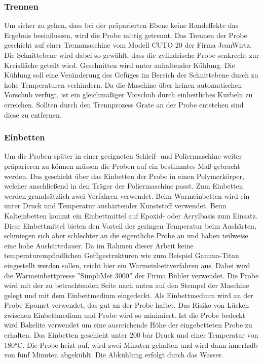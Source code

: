 \documentclass[a4paper, 11pt]{tubsreprt}
\begin{document}
\subsubsection{Trennen}
Um sicher zu gehen, dass bei der präparierten Ebene keine Randeffekte das Ergebnis beeinflussen, wird die Probe mittig getrennt. Das Trennen der Probe geschieht auf einer Trennmaschine vom Modell CUTO 20 der Firma JeanWirtz. Die Schnittebene wird dabei so gewählt, dass die zylindrische Probe senkrecht zur Kreisfläche geteilt wird. Geschnitten wird unter anhaltender Kühlung. Die Kühlung soll eine Veränderung des Gefüges im Bereich der Schnittebene durch zu hohe Temperaturen verhindern. Da die Maschine über keinen automatischen Vorschub verfügt, ist ein gleichmäßiger Vorschub durch einheitliches Kurbeln zu erreichen. Sollten durch den Trennprozess Grate an der Probe entstehen sind diese zu entfernen.
\subsubsection{Einbetten}
Um die Proben später in einer geeigneten Schleif- und Poliermaschine weiter präparieren zu können müssen die Proben auf ein bestimmtes Maß gebracht werden. Das geschieht über das Einbetten der Probe in einen Polymerkörper, welcher anschließend in den Träger der Poliermaschine passt. Zum Einbetten werden grundsätzlich zwei Verfahren verwendet. Beim Warmeinbetten wird ein unter Druck und Temperatur aushärtender Kunststoff verwendet. Beim Kalteinbetten kommt ein Einbettmittel auf Epoxid- oder Acrylbasis zum Einsatz. Diese Einbettmittel bieten den Vorteil der geringen Temperatur beim Aushärten, schmiegen sich aber schlechter an die eigentliche Probe an und haben teilweise eine hohe Aushärtedauer. Da im Rahmen dieser Arbeit keine temperaturempfindlichen Gefügestrukturen wie zum Beispiel Gamma-Titan eingestellt werden sollen, reicht hier ein Warmeinbettverfahren aus. Dabei wird die  Warmeinbettpresse ''SimpliMet 3000'' der Firma Bühler verwendet. Die Probe wird mit der zu betrachtenden Seite nach unten auf den Stempel der Maschine gelegt und mit dem Einbettmedium eingedeckt. Als Einbettmedium wird an der Probe Epomet verwendet, das gut an der Probe haftet. Das Risiko von Lücken zwischen Einbettmedium und Probe wird so minimiert. Ist die Probe bedeckt wird Bakelite verwendet um eine ausreichende Höhe der eingebetteten Probe zu erhalten. Das Einbetten geschieht unter 200 bar Druck und einer Temperatur von 180°C. Die Probe heizt auf, wird zwei Minuten gehalten und wird dann innerhalb von fünf Minuten abgekühlt. Die Abkühlung erfolgt durch das Wasser. 
\end{document}
